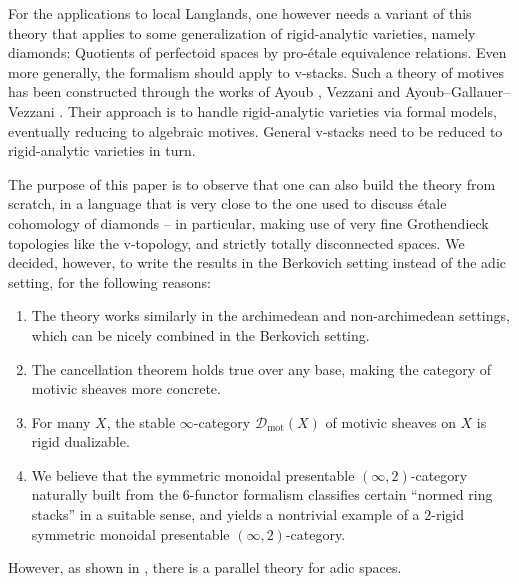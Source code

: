 \documentclass[11pt]{amsart}
\numberwithin{equation}{section}
\numberwithin{theorem}{section}
\theoremstyle{definition}
\begin{document}
For the applications to local Langlands, one however needs a variant of this theory that applies to some generalization of rigid-analytic varieties, namely diamonds: Quotients of perfectoid spaces by pro-\'etale equivalence relations. Even more generally, the formalism should apply to v-stacks. Such a theory of motives has been constructed through the works of Ayoub \cite{AyoubRigid}, Vezzani \cite{Vezzani} and Ayoub--Gallauer--Vezzani \cite{AyoubGallauerVezzani}. Their approach is to handle rigid-analytic varieties via formal models, eventually reducing to algebraic motives. General v-stacks need to be reduced to rigid-analytic varieties in turn.

The purpose of this paper is to observe that one can also build the theory from scratch, in a language that is very close to the one used to discuss \'etale cohomology of diamonds \cite{ECoD} -- in particular, making use of very fine Grothendieck topologies like the v-topology, and strictly totally disconnected spaces. We decided, however, to write the results in the Berkovich setting instead of the adic setting, for the following reasons:
\begin{enumerate}
\item[{\rm (1)}] The theory works similarly in the archimedean and non-archimedean settings, which can be nicely combined in the Berkovich setting.
\item[{\rm (2)}] The cancellation theorem holds true over any base, making the category of motivic sheaves more concrete.
\item[{\rm (3)}] For many $X$, the stable $\infty$-category $\mathcal D_{\mathrm{mot}}(X)$ of motivic sheaves on $X$ is rigid dualizable.
\item[{\rm (4)}] We believe that the symmetric monoidal presentable $(\infty,2)$-category naturally built from the $6$-functor formalism classifies certain ``normed ring stacks'' in a suitable sense, and yields a nontrivial example of a $2$-rigid symmetric monoidal presentable $(\infty,2)$-category.
\end{enumerate}

However, as shown in \cite{AyoubGallauerVezzani}, there is a parallel theory for adic spaces.
\end{document}
